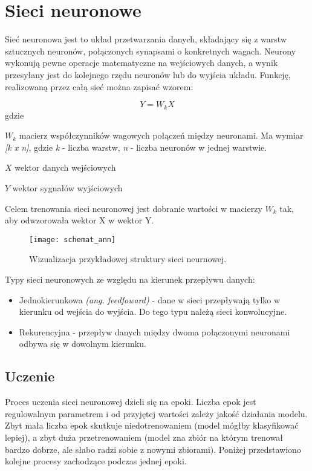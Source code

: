 \section{Sieci neuronowe}

Sieć neuronowa jest to układ przetwarzania danych, składający się z warstw sztucznych neuronów, połączonych synapsami o konkretnych wagach. Neurony wykonują pewne operacje matematyczne na wejściowych danych, a wynik przesyłany jest do kolejnego rzędu neuronów lub do wyjścia układu. Funkcję, realizowaną przez całą sieć można zapisać wzorem: \cite{tadeusiewicz_sn}

\begin{equation}
Y = W_k X
\end{equation}
gdzie
\begin{eqwhere}[2cm]
	\item[$W_k$] macierz współczynników wagowych połączeń między neuronami. Ma wymiar \textit{[k x n]}, gdzie \textit{k} - liczba warstw, \textit{n} - liczba neuronów w jednej warstwie.
	\item[$X$] wektor danych wejściowych
	\item[$Y$] wektor sygnałów wyjściowych
\end{eqwhere}

Celem trenowania sieci neuronowej jest dobranie wartości w macierzy \textit{$W_k$} tak, aby odwzorowała wektor X w wektor Y. 

\begin{figure}[h]
	\centering
	\centering
		\texttt{[image: schemat\_ann]}	
	\caption{Wizualizacja przykładowej struktury sieci neurnowej.}
\end{figure}

Typy sieci neuronowych ze względu na kierunek przepływu danych:
\begin{itemize}
\item{Jednokierunkowa \textit{(ang. feedfoward)} - dane w sieci przepływają tylko w kierunku od wejścia do wyjścia. Do tego typu należą sieci konwolucyjne.}
\item{Rekurencyjna - przepływ danych między dwoma połączonymi neuronami odbywa się w dowolnym kierunku.}
\end{itemize}

\subsection{Uczenie}
Proces uczenia sieci neuronowej dzieli się na epoki. Liczba epok jest regulowalnym parametrem i od przyjętej wartości zależy jakość działania modelu. Zbyt mała liczba epok skutkuje niedotrenowaniem (model mógłby klasyfikować lepiej), a zbyt duża przetrenowaniem (model zna zbiór na którym trenował bardzo dobrze, ale słabo radzi sobie z nowymi zbiorami). Poniżej przedstawiono kolejne procesy zachodzące podczas jednej epoki.

